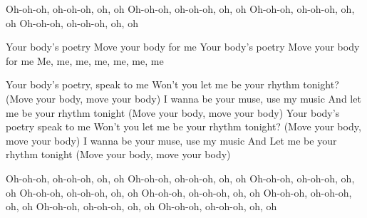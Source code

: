 Oh-oh-oh, oh-oh-oh, oh, oh
Oh-oh-oh, oh-oh-oh, oh, oh
Oh-oh-oh, oh-oh-oh, oh, oh
Oh-oh-oh, oh-oh-oh, oh, oh

Your body's poetry
Move your body for me
Your body's poetry
Move your body for me
Me, me, me, me, me, me, me

Your body's poetry, speak to me
Won't you let me be your rhythm tonight?
(Move your body, move your body)
I wanna be your muse, use my music
And let me be your rhythm tonight
(Move your body, move your body)
Your body's poetry speak to me
Won't you let me be your rhythm tonight?
(Move your body, move your body)
I wanna be your muse, use my music
And Let me be your rhythm tonight
(Move your body, move your body)

Oh-oh-oh, oh-oh-oh, oh, oh
Oh-oh-oh, oh-oh-oh, oh, oh
Oh-oh-oh, oh-oh-oh, oh, oh
Oh-oh-oh, oh-oh-oh, oh, oh
Oh-oh-oh, oh-oh-oh, oh, oh
Oh-oh-oh, oh-oh-oh, oh, oh
Oh-oh-oh, oh-oh-oh, oh, oh
Oh-oh-oh, oh-oh-oh, oh, oh
\elyrics